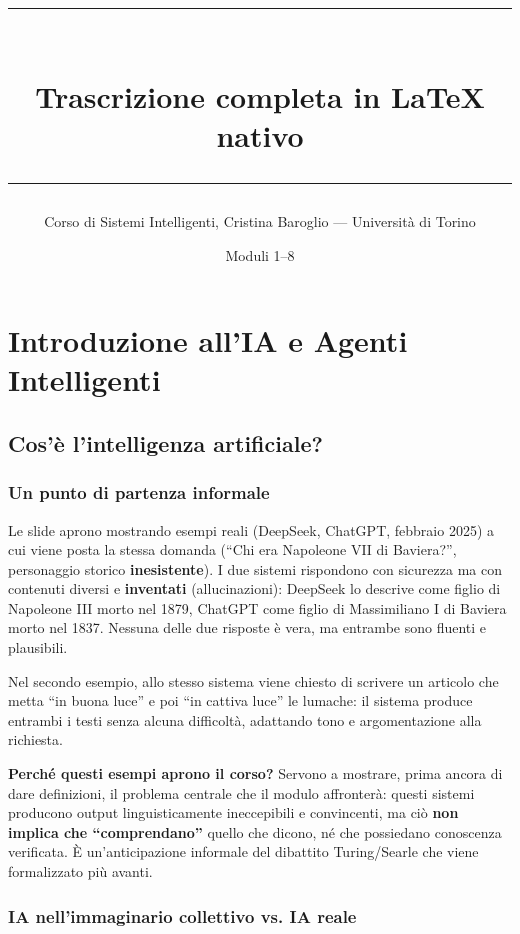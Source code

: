 \documentclass[11pt,a4paper]{report}
\title{\vspace{-1cm}{\large Sistemi Intelligenti --- Appunti di Teoria}\\[0.3cm]
  \rule{\linewidth}{1pt}\\[0.3cm]
  {\Large\bfseries Trascrizione completa in LaTeX nativo}\\[0.3cm]
  \rule{\linewidth}{1pt}}
\author{Corso di Sistemi Intelligenti, Cristina Baroglio --- Università di Torino}
\date{Moduli 1--8}
\begin{document}
\maketitle
\tableofcontents

\chapter{Introduzione all'IA e Agenti Intelligenti}

\section{Cos'è l'intelligenza artificiale?}

\subsection{Un punto di partenza informale}

Le slide aprono mostrando esempi reali (DeepSeek, ChatGPT, febbraio 2025) a cui viene posta la stessa domanda (``Chi era Napoleone VII di Baviera?'', personaggio storico \textbf{inesistente}). I due sistemi rispondono con sicurezza ma con contenuti diversi e \textbf{inventati} (allucinazioni): DeepSeek lo descrive come figlio di Napoleone III morto nel 1879, ChatGPT come figlio di Massimiliano I di Baviera morto nel 1837. Nessuna delle due risposte è vera, ma entrambe sono fluenti e plausibili.

Nel secondo esempio, allo stesso sistema viene chiesto di scrivere un articolo che metta ``in buona luce'' e poi ``in cattiva luce'' le lumache: il sistema produce entrambi i testi senza alcuna difficoltà, adattando tono e argomentazione alla richiesta.

\textbf{Perché questi esempi aprono il corso?} Servono a mostrare, prima ancora di dare definizioni, il problema centrale che il modulo affronterà: questi sistemi producono output linguisticamente ineccepibili e convincenti, ma ciò \textbf{non implica che ``comprendano''} quello che dicono, né che possiedano conoscenza verificata. È un'anticipazione informale del dibattito Turing/Searle che viene formalizzato più avanti.

\subsection{IA nell'immaginario collettivo vs. IA reale}
\end{document}
